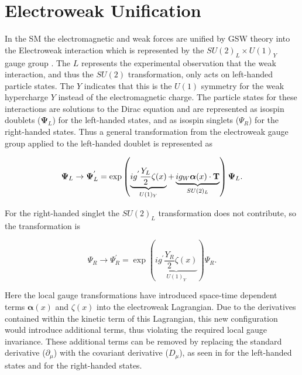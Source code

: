 \section{Electroweak Unification} \label{sec:theory:gsw}

In the SM the electromagnetic and weak forces are unified by GSW theory into
the Electroweak interaction which is represented by the $SU(2)_L \times U(1)_Y$
gauge group \cite{Glashow:1961tr, Goldstone:1962es, Weinberg:1967tq}.
The $L$ represents the experimental observation that the weak interaction, and
thus the $SU(2)$ transformation, only acts on left-handed particle states.  The
$Y$ indicates that this is the $U(1)$ symmetry for the weak hypercharge $Y$
instead of the electromagnetic charge.  The particle states for these
interactions are solutions to the Dirac equation and are represented as isospin
doublets ($\boldsymbol{\Psi}_{L}$) for the left-handed states, and as isospin
singlets ($\Psi_R$) for the right-handed states.  Thus a general transformation
from the electroweak gauge group applied to the left-handed doublet is
represented as

\begin{equation} \label{eq:gsw:doublet} 
\boldsymbol{\Psi}_{L} \rightarrow \boldsymbol{\Psi}_{L}^{'} = \exp \left(
\underbrace{ ig^{'} \frac{Y_L}{2}
\zeta (x) }_{U(1)_Y} + \underbrace{ ig_{W} \boldsymbol{\alpha}(x) \cdot
\text{\bf{T}} }_{SU(2)_L} \right) \boldsymbol{\Psi}_{L}.
\end{equation}

For the right-handed singlet the $SU(2)_L$ transformation does not contribute,
so the transformation is

\begin{equation} \label{eq:gsw:singlet} 
{\Psi_R} \rightarrow \Psi_R^{'} = \exp \left( \underbrace{ ig^{'} \frac{Y_R}{2}
\zeta (x) }_{U(1)_Y} \right) \Psi_R.
\end{equation}

Here the local gauge transformations have introduced space-time dependent terms
$\boldsymbol{\alpha}(x)$ and $\zeta(x)$ into the electroweak Lagrangian.  Due
to the derivatives contained within the kinetic term of this Lagrangian, this
new configuration would introduce additional terms, thus violating the required
local gauge invariance.  These additional terms can be removed by replacing the
standard derivative ($\partial_{\mu}$) with the covariant derivative
($D_{\mu}$), as seen in  for the left-handed states and
 for the right-handed states.


